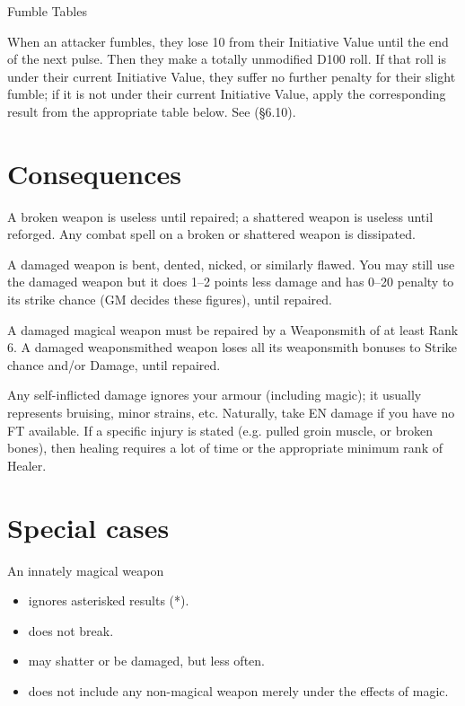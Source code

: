 \begin{Chapter}{Fumble Tables}

When an attacker fumbles, they lose 10 from their Initiative Value
until the end of the next pulse.  Then they make a totally unmodified
D100 roll.  If that roll is under their current Initiative Value, they
suffer no further penalty for their slight fumble; if it is not under
their current Initiative Value, apply the corresponding result from
the appropriate table below. See (§6.10).

\section{Consequences}

A broken weapon is useless until repaired; a shattered weapon is
useless until reforged. Any combat spell on a broken or shattered
weapon is dissipated.

A damaged weapon is bent, dented, nicked, or similarly flawed.  You
may still use the damaged weapon but it does 1–2 points less damage
and has 0–20 penalty to its strike chance (GM decides these figures),
until repaired.

A damaged magical weapon must be repaired by a Weaponsmith of at least
Rank 6.  A damaged weaponsmithed weapon loses all its weaponsmith
bonuses to Strike chance and/or Damage, until repaired.

Any self-inflicted damage ignores your armour (including magic); it
usually represents bruising, minor strains, etc.  Naturally, take EN
damage if you have no FT available.  If a specific injury is stated
(e.g. pulled groin muscle, or broken bones), then healing requires a
lot of time or the appropriate minimum rank of Healer.

\section{Special cases}

An innately magical weapon  

\begin{itemize}
\item ignores asterisked results (*).  
\item does not break.  
\item may shatter or be damaged, but less often.  
\item does not include any non-magical weapon merely under the effects of magic. 
\end{itemize}


\end{Chapter}
